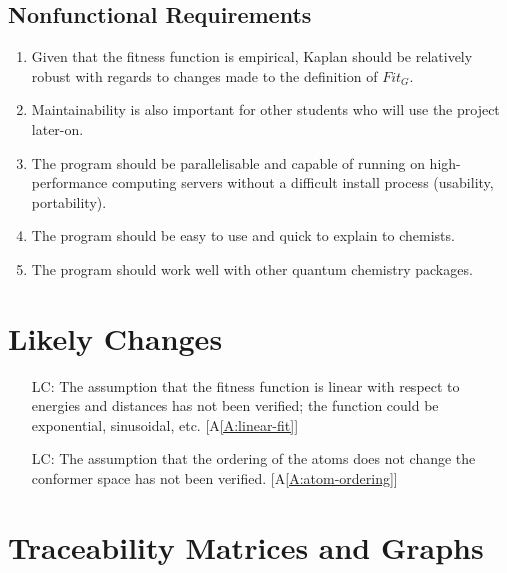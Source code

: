 \documentclass[12pt]{article}
\newcommand{\aref}[1]{A\ref{#1}}
\newcounter{lcnum} %
\newcommand{\progname}{Kaplan} %
\begin{document}
\subsection{Nonfunctional Requirements}

\begin{enumerate}
	\item Given that the fitness function is 
	empirical, \progname{} should be relatively 
robust with regards to changes made to the definition 
of $Fit_G$.

\item Maintainability is also important for other 
students who will use the project 
later-on. 

\item The program should be parallelisable and capable 
of running on 
high-performance computing servers without a difficult install process 
(usability, portability). 

\item The program should be easy to use and quick to explain to chemists.

\item The program should work well with other quantum 
chemistry packages.

\end{enumerate}

\section{Likely Changes} \label{section-lc}

\noindent \begin{itemize}

\item[LC\refstepcounter{lcnum}\thelcnum\label{LC_linear-fit}:] The assumption 
that the fitness function is linear with respect to energies and distances has 
not been verified; the function could be exponential, sinusoidal, etc.
[\aref{A:linear-fit}]

\item[LC\refstepcounter{lcnum}\thelcnum\label{LC_indep-ordering}:] The 
assumption that the ordering of the atoms does not change the conformer space 
has not been verified. [\aref{A:atom-ordering}]

\end{itemize}

\section{Traceability Matrices and Graphs} \label{section-trace}
\end{document}
